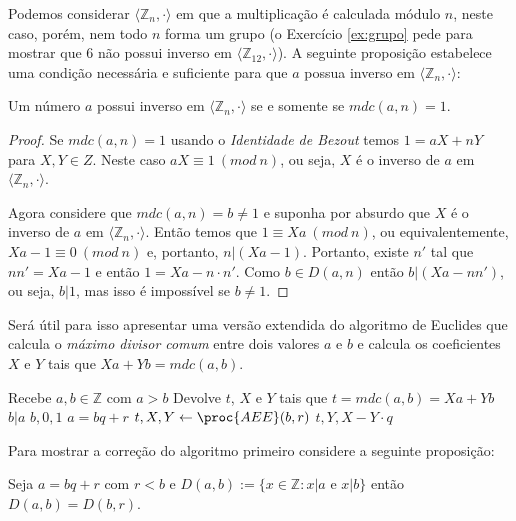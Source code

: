 Podemos considerar $\langle \mathbb{Z}_n, \cdot \rangle$ em que a multiplicação é calculada módulo $n$, neste caso, porém, nem todo $n$ forma um grupo (o Exercício \ref{ex:grupo} pede para mostrar que $6$ não possui inverso em $\langle \mathbb{Z}_{12}, \cdot \rangle$).
A seguinte proposição estabelece uma condição necessária e suficiente para que $a$ possua inverso em $\langle \mathbb{Z}_n, \cdot \rangle$:

\begin{proposition}
\label{prop:inverso}
Um número $a$ possui inverso em $\langle \mathbb{Z}_n, \cdot \rangle$ se e somente se $mdc(a,n) = 1$.
\end{proposition}
\begin{proof}
  Se $mdc(a, n) = 1$ usando o {\em Identidade de Bezout} temos $1 = aX + nY$ para $X, Y \in Z$.
  Neste caso $aX \equiv 1\ (mod\ n)$, ou seja, $X$ é o inverso de $a$ em $\langle \mathbb{Z}_n, \cdot \rangle$.

Agora considere que $mdc(a, n) = b \neq 1$ e suponha por absurdo que $X$ é o
inverso de $a$ em $\langle \mathbb{Z}_n , \cdot \rangle$. 
Então temos que $1 \equiv Xa\ (mod\ n)$, ou equivalentemente, $Xa - 1 \equiv 0\ (mod\ n)$ e, portanto, $n|(Xa - 1)$.
Portanto, existe $n'$ tal que $nn' = Xa - 1$ e então $1 = Xa - n \cdot n'$. 
Como $b \in D(a,n)$ então $b|(Xa - nn')$, ou seja, $b|1$, mas isso é impossível se $b \neq 1$.
\end{proof}

Será útil para isso apresentar uma versão extendida do algoritmo de Euclides que calcula o {\em máximo divisor comum} entre dois valores $a$ e $b$ e calcula os coeficientes $X$ e $Y$ tais que $Xa + Yb = mdc(a,b)$.

\begin{codebox}
\li \Comment Recebe $a, b \in \mathbb{Z}$ com $a > b$
\li \Comment Devolve $t$, $X$ e $Y$ tais que $t = mdc(a,b) = Xa + Yb$  
\li \If $b|a$
\li     \Then 
        \Return $b, 0, 1$
\Comment $a = bq + r$
\li \Else $t, X, Y \gets \proc{AEE}(b, r)$
\li     \Return $t, Y, X - Y \cdot q$
\End
\end{codebox}

Para mostrar a correção do algoritmo primeiro considere a seguinte proposição:

\begin{proposition}
  Seja $a = bq + r$ com $r < b$ e $D(a, b) := \{ x \in \mathbb{Z} : x|a$ e $x|b \}$ então $D(a,b) = D(b,r)$.
\end{proposition}


